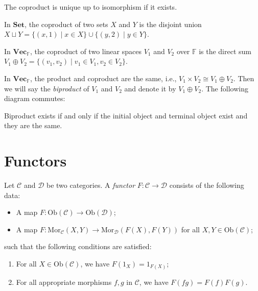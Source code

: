 \documentclass[
	11pt, %
	fleqn, %
	a4paper, %
]{LegrandOrangeBook}
\newcommand{\F}{\mathbb{F}} %
\newcommand{\C}{\mathcal{C}} %
\newcommand{\Set}{\textbf{Set}} %
\newcommand{\Vect}{\textbf{Vec}} %
\newcommand{\Mor}{\text{Mor}} %
\newcommand{\Ob}[1]{\text{Ob}(#1)} %
\begin{document}
\begin{remark}
    The coproduct is unique up to isomorphism if it exists.
\end{remark}

\begin{example}
    In $\Set$, the coproduct of two sets $X$ and $Y$ is the disjoint union $X \sqcup Y = \{ (x, 1) \mid x \in X \} \cup \{ (y, 2) \mid y \in Y \}$.
\end{example}

\begin{example}
    In $\Vect_{\F}$, the coproduct of two linear spaces $V_1$ and $V_2$ over $\F$ is the direct sum $V_1 \oplus V_2 = \{ (v_1, v_2) \mid v_1 \in V_1, v_2 \in V_2 \}$.
\end{example}

In $\Vect_{\F}$, the product and coproduct are the same, i.e., $V_1 \times V_2 \cong V_1 \oplus V_2$. Then we will say the \emph{biproduct} of $V_1$ and $V_2$ and denote it by $V_1 \oplus V_2$. The following diagram commutes:
\begin{center}
\end{center}

\begin{remark}
    Biproduct exists if and only if the initial object and terminal object exist and they are the same.
\end{remark}

\newpage

\section{Functors}

\begin{definition}[Functors]
    Let $\C$ and $\mathcal{D}$ be two categories. A \emph{functor} $F : \C \to \mathcal{D}$ consists of the following data:
    \begin{itemize}
        \item A map $F : \Ob{\C} \to \Ob{\mathcal{D}}$;
        \item A map $F : \Mor_{\C}(X, Y) \to \Mor_{\mathcal{D}}(F(X), F(Y))$ for all $X, Y \in \Ob{\C}$;
    \end{itemize}
    such that the following conditions are satisfied:
    \begin{enumerate}[label=(\alph*)]
        \item For all $X \in \Ob{\C}$, we have $F(1_X) = 1_{F(X)}$;
        \item For all appropriate morphisms $f, g$ in $\C$, we have $F(fg) = F(f) F(g)$.
    \end{enumerate}
\end{definition}
\end{document}

